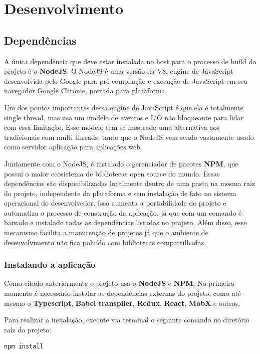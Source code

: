 \documentclass[rel_mlp]{iiufrgs}
\begin{document}
\chapter{Desenvolvimento}


\section{Dependências}
A única dependência que deve estar instalada no host para o processo de build do projeto é o \textbf{NodeJS}.
O NodeJS é uma versão da V8, engine de JavaScript desenvolvida pelo Google para pré-compilação e execução de
JavaScript em seu navegador Google Chrome, portada para plataforma. \par
Um dos pontos importantes dessa engine de JavaScript é que ela é totalmente single thread, mas usa um modelo de eventos e I/O não bloqueante para lidar com essa limitação. Esse modelo tem se mostrado uma alternativa aos tradicionais com multi threads, tanto que o NodeJS vem sendo vastamente usado como servidor aplicação para aplicações web. \par
Juntamente com o NodeJS, é instalado o gerenciador de pacotes \textbf{NPM}, que possui o maior ecosistema de bibliotecas open source do mundo.
Essas dependências são disponibilizadas localmente dentro de uma pasta na mesma raiz do projeto, independente da plataforma e sem instalação de fato no sistema operacional do desenvolvedor.
Isso aumenta a portabilidade do projeto e automatiza o processo de construção da aplicação, já que com um comando é baixado e instalado todas as dependências listadas no projeto.
Além disso, esse mecanismo facilita a manutenção de projetos já que o ambiente de desenvolvimento não fica poluído com bibliotecas compartilhadas.

\subsection{Instalando a aplicação}
Como citado anteriormente o projeto usa o \textbf{NodeJS} e \textbf{NPM}. No primeiro momento é necessário instalar as dependências externas do projeto, como até mesmo o \textbf{Typescript}, \textbf{Babel transpiler}, \textbf{Redux}, \textbf{React}, \textbf{MobX} e outros. \par
Para realizar a instalação, execute via terminal o seguinte comando no diretório raíz do projeto:

\begin{lstlisting}[language=JavaScript]
  npm install
\end{lstlisting}
\end{document}
